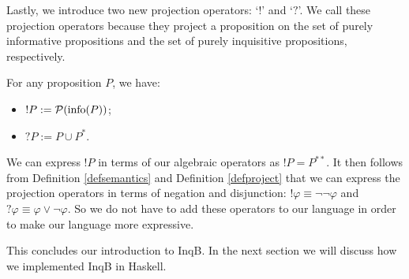 Lastly, we introduce two new projection operators: `$!$' and `$?$'. We call these projection operators because they project a proposition on the set of purely informative propositions and the set of purely inquisitive propositions, respectively.

\begin{defi}\label{defproject}
 For any proposition $P$, we have:
 \begin{itemize}
     \item $!P:= \mathcal{P}(\textrm{info}(P))$;
     \item $?P:= P\cup P^*$.
 \end{itemize}
\end{defi}

We can express $!P$ in terms of our algebraic operators as $!P=P^{**}$. It then follows from Definition \ref{defsemantics} and Definition \ref{defproject} that we can express the projection operators in terms of negation and disjunction: $!\varphi \equiv \neg\neg\varphi$ and $?\varphi\equiv \varphi \lor \neg \varphi$. So we do not have to add these operators to our language in order to make our language more expressive.

This concludes our introduction to \textsf{InqB}. In the next section we will discuss how we implemented \textsf{InqB} in Haskell. 


